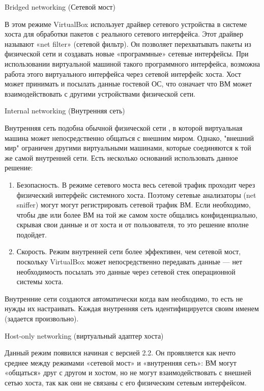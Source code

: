 \begin{itemize}
{\item Bridged networking (Сетевой мост)

В этом режиме VirtualBox использует драйвер сетевого устройства в системе хоста для обработки пакетов с реального сетевого интерфейса. Этот драйвер называют «net filter» (сетевой фильтр). Он позволяет перехватывать пакеты из физической сети и создавать новые «программные» сетевые интерфейсы. При использовании виртуальной машиной такого программного интерфейса, возможна работа этого виртуального интерфейса через сетевой интерфейс хоста. Хост может принимать и посылать данные гостевой ОС, что означает что ВМ может взаимодействовать с другими устройствами физической сети.
}

{\item Internal networking (Внутренняя сеть)


Внутренняя сеть подобна обычной физической сети , в которой виртуальная машина может непосредственно общаться с внешним миром. Однако, "внешний мир" ограничен другими виртуальными машинами, которые соединяются к той же самой внутренней сети. Есть несколько оснований использовать данное решение:
	\begin{enumerate}
	\item Безопасность. В режиме сетевого моста весь сетевой трафик проходит через физический интерфейс системного хоста. Поэтому сетевые анализаторы (net sniffer) могут могут регистрировать сетевой трафик ВМ. Если необходимо, чтобы две или более ВМ на той же самом хосте общались конфиденциально, скрывая свои данные и от хоста и от пользователя, то это решение вполне подойдет.
	\item Скорость. Режим внутренней сети более эффективен, чем сетевой мост, поскольку VirtualBox может непосредственно передавать данные — нет необходимость посылать это данные через сетевой стек операционной системы хоста.
	\end{enumerate}

Внутренние сети создаются автоматически когда вам необходимо, то есть не нужды их настраивать. Каждая внутренняя сеть идентифицируется своим именем (задается произвольно).
}

{\item Host-only networking (виртуальный адаптер хоста)

Данный режим появился начиная с версией 2.2. Он проявляется как нечто среднее между режимами «сетевой мост» и «внутренняя сеть»: ВМ могут «общаться» друг с другом и хостом, но не могут взаимодействовать с внешней сетью хоста, так как они не связаны с его физическим сетевым интерфейсом.

}
\end{itemize}

